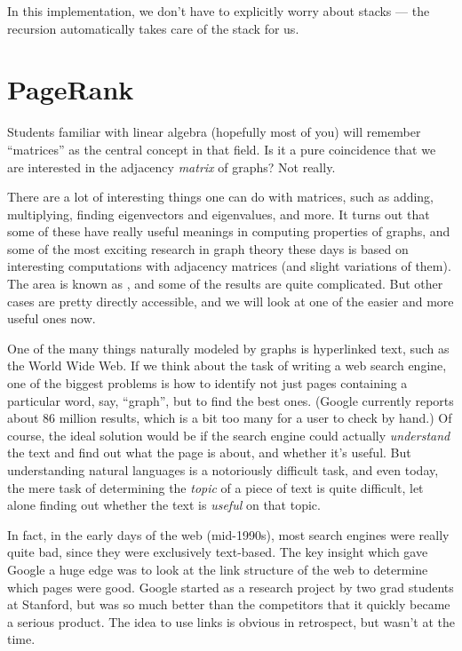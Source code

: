 In this implementation, we don't have to explicitly worry about stacks
--- the recursion automatically takes care of the stack for us.

\section{PageRank}
Students familiar with linear algebra (hopefully most of you) will
remember ``matrices'' as the central concept in that field. 
Is it a pure coincidence that we are interested in the adjacency
\emph{matrix} of graphs? Not really.

There are a lot of interesting things one can do with matrices, such
as adding, multiplying, finding eigenvectors and eigenvalues, and
more. It turns out that some of these have really 
useful meanings in computing properties of graphs, and some of the most
exciting research in graph theory these days is based on interesting
computations with adjacency matrices (and slight variations of them).
The area is known as , and some of the
results are quite complicated. But other cases are pretty directly
accessible, and we will look at one of the easier and more useful ones
now.

One of the many things naturally modeled by graphs is hyperlinked
text, such as the World Wide Web. If we think about the task of
writing a web search engine, one of the biggest problems is how to
identify not just pages containing a particular word, say, ``graph'',
but to find the best ones. (Google currently reports about 86 million
results, which is a bit too many for a user to check by hand.)
Of course, the ideal solution would be if the search engine could
actually \emph{understand} the text and find out what the page is
about, and whether it's useful. But understanding natural languages is
a notoriously difficult task, and even today, the mere task of
determining the \emph{topic} of a piece of text is quite difficult,
let alone finding out whether the text is \emph{useful} on that
topic.

In fact, in the early days of the web (mid-1990s), most search engines
were really quite bad, since they were exclusively text-based.
The key insight which gave Google a huge edge was to look at the link
structure of the web to determine which pages were good. Google
started as a research project by two grad students at Stanford, but
was so much better than the competitors that it quickly became a
serious product. The idea to use links is obvious in retrospect, but
wasn't at the time.

